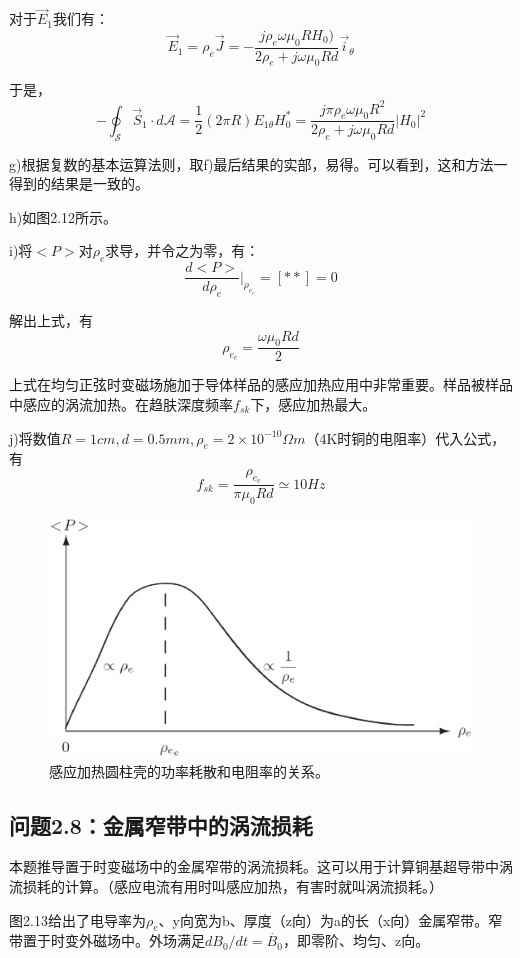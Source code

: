 对于$\vec{E}_1$我们有：
$$\vec{E}_1=\rho_e \vec{J}=-\frac{j\rho_e \omega \mu_0 R H_0)}{2\rho_e+j\omega \mu_0 R d}\vec{i}_\theta$$

于是，
$$-\oint_{\mathcal{S}}\vec{S}_1 \cdot d\mathcal{A}=\frac{1}{2}(2\pi R)E_{1\theta} H_0^*=\frac{j\pi\rho_e \omega \mu_0 R^2}{2\rho_e+j\omega \mu_0 R d} |H_0|^2$$

g)根据复数的基本运算法则，取f)最后结果的实部，易得。可以看到，这和方法一得到的结果是一致的。

h)如图2.12所示。

i)将$<P>$对$\rho_e$求导，并令之为零，有：
$$\frac{d<P>}{d\rho_e} |_{\rho_{e_c}}=[**]=0$$

解出上式，有
$$\rho_{e_c}=\frac{\omega \mu_0 R d}{2}$$

上式在均匀正弦时变磁场施加于导体样品的感应加热应用中非常重要。样品被样品中感应的涡流加热。在趋肤深度频率$f_{sk}$下，感应加热最大。

j)将数值$R=1cm, d=0.5mm,\rho_e=2\times 10^{-10}\Omega m$（4K时铜的电阻率）代入公式，有
$$f_{sk}=\frac{\rho_{e_c}}{\pi\mu_0 R d}\simeq 10Hz$$

\begin{figure}
  \centering
 \includegraphics[scale=0.3]{chpt2/figs/fig2.12.eps}
  \caption{感应加热圆柱壳的功率耗散和电阻率的关系。}
\end{figure}


\subsection{问题2.8：金属窄带中的涡流损耗}
本题推导置于时变磁场中的金属窄带的涡流损耗。这可以用于计算铜基超导带中涡流损耗的计算。（感应电流有用时叫感应加热，有害时就叫涡流损耗。）

图2.13给出了电导率为$\rho_e$、y向宽为b、厚度（z向）为a的长（x向）金属窄带。窄带置于时变外磁场中。外场满足$dB_0/dt=\dot{B_0}$，即零阶、均匀、z向。

